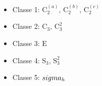 \begin{itemize}
  \item Classe 1: $\mathrm{C}_{2}^{(a)}$, $\mathrm{C}_{2}^{(b)}$, $\mathrm{C}_{2}^{(c)}$
  \item Classe 2: $\mathrm{C}_{3}$, $\mathrm{C}_{3}^{2}$
  \item Classe 3: $\mathrm{E}$
  \item Classe 4: $\mathrm{S}_{3}$, $\mathrm{S}_{3}^{2}$
  \item Classe 5: $\\sigma_{h}$
\end{itemize}
